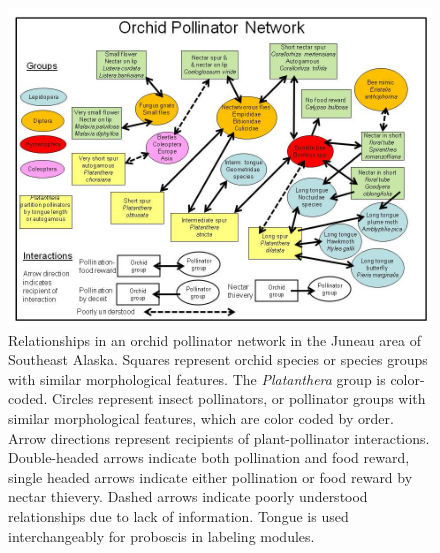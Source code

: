 \begin{figure}[H]
\begin{center}
\vspace{2mm}
\includegraphics[width=\textwidth]{img/pollinator_network.jpg}
\caption{Relationships in an orchid pollinator network in the Juneau area of Southeast Alaska.  Squares represent orchid species or species groups with similar morphological features.  The \emph{Platanthera} group is color-coded. Circles represent insect pollinators, or pollinator groups with similar morphological features, which are color coded by order.  Arrow directions represent recipients of plant-pollinator interactions.  Double-headed arrows indicate both pollination and food reward, single headed arrows indicate either pollination or food reward by nectar thievery.  Dashed arrows indicate poorly understood relationships due to lack of information.  Tongue is used interchangeably for proboscis in labeling modules.}
\label{pollinator_network}
\end{center}
\end{figure} 
